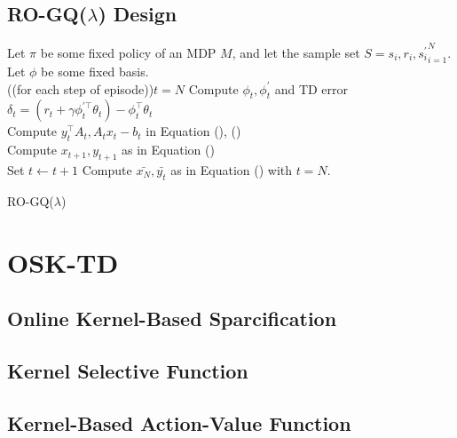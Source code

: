 \documentclass[conference]{IEEEtran}
\makeatletter
\newcommand{\removelatexerror}{\let\@latex@error\@gobble}
\newcommand{\dosemic}{\renewcommand{\@endalgocfline}{\algocf@endline}}%
\newcommand{\pushline}{\Indp}%
\let\oldnl\nl%
\newcommand{\nonl}{\renewcommand{\nl}{\let\nl\oldnl}}%
\makeatother
\begin{document}
\subsection{RO-GQ($\lambda$) Design}
{
	\removelatexerror%
	\LinesNumbered
	\begin{algorithm}[H]
		\pushline\dosemic\nonl \textup{Let $\pi$ be some fixed policy of an MDP $M$, and let the sample set $S={s_i, r_i, s_i^{'}}_{i=1}^N$. Let $\phi$ be some fixed basis.}\\

		\Repeat({(for each step of episode)}){$t=N$}{
	  		\textup{Compute $\phi_t, \phi_t^{'}$ and TD error $\delta_t=(r_t+\gamma\phi_t^{'\top}\theta_t)-\phi_t^\top\theta_t$}\\
	  		\textup{Compute $y_t^\top A_t, A_tx_t-b_t$ in Equation (), ()}\\
			\textup{Compute $x_{t+1}, y_{t+1}$ as in Equation ()}\\
			\textup{Set $t\leftarrow t+1$}
  		}
  		\textup{Compute $\bar{x_N}, \bar{y_t}$ as in Equation () with $t=N$}.
 		\caption{RO-GQ($\lambda$)}
	\end{algorithm}
}



\section{OSK-TD}
\subsection{Online Kernel-Based Sparcification}
\subsection{Kernel Selective Function}
\subsection{Kernel-Based Action-Value Function}




%
%
\end{document}
